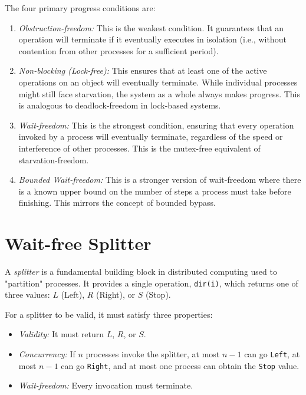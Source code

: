 The four primary progress conditions are:
\begin{enumerate}
    \item \textit{Obstruction-freedom:} This is the weakest condition. It guarantees that an operation will terminate if it eventually executes in isolation (i.e., without contention from other processes for a sufficient period).
    \item \textit{Non-blocking (Lock-free):} This ensures that at least one of the active operations on an object will eventually terminate. While individual processes might still face starvation, the system as a whole always makes progress. This is analogous to deadlock-freedom in lock-based systems.
    \item \textit{Wait-freedom:} This is the strongest condition, ensuring that every operation invoked by a process will eventually terminate, regardless of the speed or interference of other processes. This is the mutex-free equivalent of starvation-freedom.
    \item \textit{Bounded Wait-freedom:} This is a stronger version of wait-freedom where there is a known upper bound on the number of steps a process must take before finishing. This mirrors the concept of bounded bypass.
\end{enumerate}

\section{Wait-free Splitter}
A \textit{splitter} is a fundamental building block in distributed computing used to "partition" processes. It provides a single operation, \texttt{dir(i)}, which returns one of three values: $L$ (Left), $R$ (Right), or $S$ (Stop).

For a splitter to be valid, it must satisfy three properties:
\begin{itemize}
    \item \textit{Validity:} It must return $L$, $R$, or $S$.
    \item \textit{Concurrency:} If $n$ processes invoke the splitter, at most $n-1$ can go \texttt{Left}, at most $n-1$ can go \texttt{Right}, and at most one process can obtain the \texttt{Stop} value.
    \item \textit{Wait-freedom:} Every invocation must terminate.
\end{itemize}

